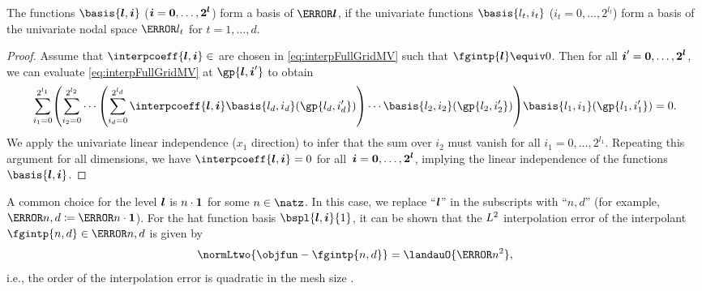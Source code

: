 \vspace*{\fill}
\pagebreak

\begin{lemma}
  \label{lemma:tensorProductLinearIndependence}
  The functions $\basis{\*l,\*i}$ (${\boldsymbol{i}} = {\boldsymbol{0}}, \dotsc, {\boldsymbol{2}}^{{\boldsymbol{l}}}$)
  form a basis of $\ns{\*l}$, if the univariate functions
  $\basis{l_t,i_t}$ ($i_t = 0, \dotsc, 2^{l_t}$)
  form a basis of the univariate nodal space $\ns{l_t}$
  for $t = 1, \dotsc, d$.
\end{lemma}
\begin{proof}
  Assume that $\interpcoeff{\*l,\*i} \in \real$ are chosen in \eqref{eq:interpFullGridMV}
  such that $\fgintp{\*l} \equiv 0$.
  Then for all ${\boldsymbol{i}}' = {\boldsymbol{0}}, \dotsc, {\boldsymbol{2}}^{{\boldsymbol{l}}}$,
  we can evaluate \eqref{eq:interpFullGridMV} at $\gp{\*l,\*i'}$ to obtain
  \begin{equation}
    \sum_{i_1=0}^{2^{l_1}}
    \paren*{
      \sum_{i_2=0}^{2^{l_2}} \dotsb \paren*{
        \sum_{i_d=0}^{2^{l_d}}
        \interpcoeff{\*l,\*i} \basis{l_d,i_d}(\gp{l_d,i_d'})
      } \dotsb \basis{l_2,i_2}(\gp{l_2,i_2'})
    } \basis{l_1,i_1}(\gp{l_1,i_1'})
    = 0.
  \end{equation}
  We apply the univariate linear independence ($x_1$ direction) to infer
  that the sum over $i_2$ must vanish for all $i_1 = 0, \dotsc, 2^{l_1}$.
  Repeating this argument for all dimensions, we have
  $\interpcoeff{\*l,\*i} = 0$ for all~${\boldsymbol{i}} = {\boldsymbol{0}}, \dotsc, {\boldsymbol{2}}^{{\boldsymbol{l}}}$,
  implying the linear independence of the functions $\basis{\*l,\*i}$.
\end{proof}

A common choice for the level ${\boldsymbol{l}}$ is $n \cdot {\boldsymbol{1}}$ for some $n \in \natz$.
In this case, we replace ``${\boldsymbol{l}}$'' in the subscripts with ``$n{,}d$''
(for example, $\ns{n,d} \ceq \ns{n \cdot \*1}$).
For the hat function basis $\bspl{\*l,\*i}{1}$,
it can be shown that the $L^2$ interpolation error of the interpolant
$\fgintp{n,d} \in \ns{n,d}$ is given by
\begin{equation}
  \normLtwo{\objfun - \fgintp{n,d}} = \landauO{\ms{n}^2},
\end{equation}
i.e., the order of the interpolation error is quadratic in the mesh size
.
